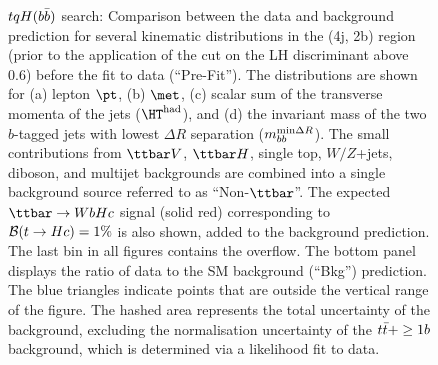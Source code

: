 \begin{figure}[htbp]
\begin{center}
\caption{\small{$tqH(b\bar{b})$ search: Comparison between the data and background prediction for several kinematic 
distributions in the (4j, 2b) region (prior to the application of the cut on the LH discriminant above 0.6) before  the fit to data (``Pre-Fit''). 
The distributions are shown for (a) lepton $\pt$, (b) $\met$, (c) scalar sum of the transverse momenta of 
the jets ($\hthad$), and (d) the invariant mass of the two $b$-tagged jets with lowest 
$\Delta R$ separation ($m_{bb}^{\textrm{min}\Delta R}$).
The small contributions from $\ttbar V$, $\ttbar H$, single top, $W/Z$+jets, diboson, and multijet backgrounds are combined 
into a single background source referred to as ``Non-$\ttbar$''. 
The expected $\Hc$ signal (solid red) corresponding to $\mathcal{B}(t\to Hc)=1\%$ is also shown,
added to the background prediction.
The last bin in all figures contains the overflow.
The bottom panel displays the ratio of data to the SM background (``Bkg'') prediction. 
The blue triangles indicate points that are outside the vertical range of the figure. 
The hashed area represents the total uncertainty of the background, excluding the normalisation uncertainty of the $t\bar{t}+\geq1b$ background, 
which is determined via a likelihood fit to data.}}
\label{fig:Hbb_extravars_4j2b}
\end{center}
\end{figure}

